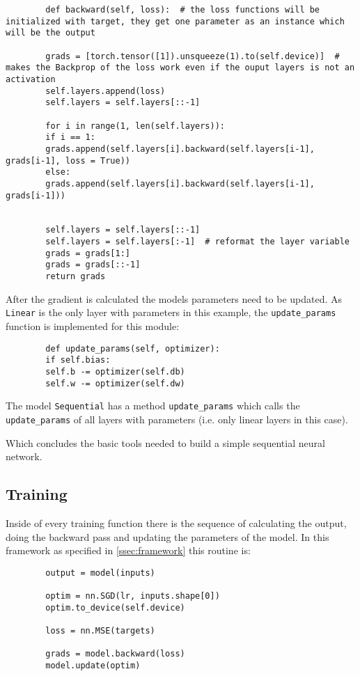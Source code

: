 \documentclass[11pt,english]{article}
\begin{document}
	\begin{lstlisting}
		def backward(self, loss):  # the loss functions will be initialized with target, they get one parameter as an instance which will be the output
		
		grads = [torch.tensor([1]).unsqueeze(1).to(self.device)]  # makes the Backprop of the loss work even if the ouput layers is not an activation
		self.layers.append(loss)
		self.layers = self.layers[::-1]
		
		for i in range(1, len(self.layers)):
		if i == 1:
		grads.append(self.layers[i].backward(self.layers[i-1], grads[i-1], loss = True))
		else:
		grads.append(self.layers[i].backward(self.layers[i-1], grads[i-1]))
		
		
		self.layers = self.layers[::-1]
		self.layers = self.layers[:-1]  # reformat the layer variable
		grads = grads[1:]
		grads = grads[::-1]
		return grads
	\end{lstlisting}
	
	After the gradient is calculated the models parameters need to be updated. As \lstinline|Linear| is the only layer with parameters in this example, the \lstinline|update_params| function is implemented for this module:
	
	\begin{lstlisting}
		def update_params(self, optimizer):
		if self.bias:
		self.b -= optimizer(self.db)
		self.w -= optimizer(self.dw)
	\end{lstlisting}
	
	The model \lstinline|Sequential| has a method \lstinline|update_params| which calls the \lstinline|update_params| of all layers with parameters (i.e. only linear layers in this case).
	
	Which concludes the basic tools needed to build a simple sequential neural network.
	
	\subsection{Training} \label{ssec:Training}
	
	Inside of every training function there is the sequence of calculating the output, doing the backward pass and updating the parameters of the model. In this framework as specified in \cref{ssec:framework} this routine is:
	
	\begin{lstlisting}
		output = model(inputs)
		
		optim = nn.SGD(lr, inputs.shape[0])
		optim.to_device(self.device)
		
		loss = nn.MSE(targets)
		
		grads = model.backward(loss)
		model.update(optim)
	\end{lstlisting} 
	
\end{document}
